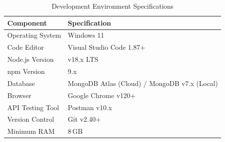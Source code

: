 \documentclass[12pt, a4paper, oneside]{report}
\begin{document}
\FloatBarrier
\begin{table}[H]
\centering
\caption{Development Environment Specifications}
\label{tab:devenv}
\renewcommand{\arraystretch}{1.3}
\begin{tabular}{|p{4.5cm}|p{8cm}|}
\hline
\textbf{Component}     & \textbf{Specification} \\
\hline
Operating System       & Windows 11  \\
\hline
Code Editor            & Visual Studio Code 1.87+ \\
\hline
Node.js Version        & v18.x LTS \\
\hline
npm Version            & 9.x \\
\hline
Database               & MongoDB Atlas (Cloud) / MongoDB v7.x (Local) \\
\hline
Browser                & Google Chrome v120+ \\
\hline
API Testing Tool       & Postman v10.x \\
\hline
Version Control        & Git v2.40+ \\
\hline
Minimum RAM            & 8\,GB \\
\hline
\end{tabular}
\end{table}
\FloatBarrier


\end{document}
